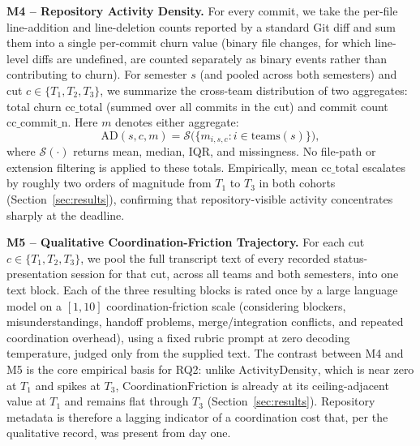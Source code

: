 \documentclass[conference]{IEEEtran}
\begin{document}
\textbf{M4 -- Repository Activity Density.} For every commit, we take the
per-file line-addition and line-deletion counts reported by a standard Git
diff and sum them into a single per-commit churn value (binary file changes,
for which line-level diffs are undefined, are counted separately as binary
events rather than contributing to churn). For semester $s$ (and pooled
across both semesters) and cut $c \in \{T_1,T_2,T_3\}$, we summarize the
cross-team distribution of two aggregates: total churn
$\mathrm{cc\_total}$ (summed over all commits in the cut) and commit count
$\mathrm{cc\_commit\_n}$. Here $m$ denotes either aggregate:
\[
\mathrm{AD}(s,c,m)
  = \mathcal{S}\bigl(\{m_{i,s,c}:i\in\mathrm{teams}(s)\}\bigr),
\]
where $\mathcal{S}(\cdot)$ returns mean, median, IQR, and missingness. No
file-path or extension filtering is applied to these totals.
Empirically, mean $\mathrm{cc\_total}$ escalates by roughly two orders of
magnitude from $T_1$ to $T_3$ in both cohorts (Section~\ref{sec:results}),
confirming that repository-visible activity concentrates sharply at the
deadline.

\textbf{M5 -- Qualitative Coordination-Friction Trajectory.} For each cut
$c \in \{T_1,T_2,T_3\}$, we pool the full transcript text of every recorded
status-presentation session for that cut, across all teams and both
semesters, into one text block. Each of the three resulting blocks is rated
once by a large language model on a $[1,10]$ coordination-friction scale
(considering blockers, misunderstandings, handoff problems, merge/integration
conflicts, and repeated coordination overhead), using a fixed rubric prompt
at zero decoding temperature, judged only from the supplied text.
The contrast between M4 and M5 is the core empirical basis for RQ2: unlike
$\mathrm{ActivityDensity}$, which is near zero at $T_1$ and spikes at $T_3$,
$\mathrm{CoordinationFriction}$ is already at its ceiling-adjacent value at
$T_1$ and remains flat through $T_3$ (Section~\ref{sec:results}). Repository
metadata is therefore a lagging indicator of a coordination cost that, per
the qualitative record, was present from day one.
\end{document}
